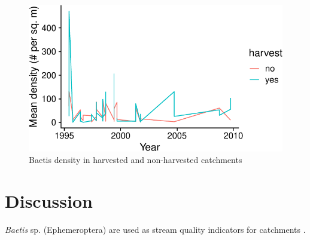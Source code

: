 \documentclass[preprint, 3p,
authoryear]{elsarticle} %
\begin{document}
\begin{figure}[H]

{\centering \includegraphics[width=0.75\linewidth]{Assignment_mockarticle_files/figure-latex/fig1-1} 

}

\caption{\label{fig1}Baetis density in harvested and non-harvested catchments}\label{fig:fig1}
\end{figure}

\hypertarget{discussion}{%
\section{Discussion}\label{discussion}}

\emph{Baetis} sp. (Ephemeroptera) are used as stream quality indicators
for catchments \citet{wallace1986response}.

\renewcommand\refname{References}

\end{document}
